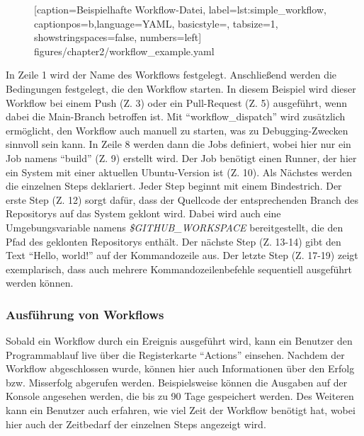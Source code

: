 \begin{figure}[h!]
	
			[caption={Beispielhafte Workflow-Datei},
			label={lst:simple_workflow},
			captionpos=b,language=YAML, basicstyle=\footnotesize, tabsize=1, showstringspaces=false,  numbers=left]
			{figures/chapter2/workflow_example.yaml}
			\end{figure}
In Zeile 1 wird der Name des Workflows festgelegt. Anschließend werden die Bedingungen festgelegt, die den Workflow starten. In diesem Beispiel wird dieser Workflow bei einem Push (Z. 3) oder ein Pull-Request (Z. 5) ausgeführt, wenn dabei die Main-Branch betroffen ist. Mit \enquote{workflow\_dispatch} wird zusätzlich ermöglicht, den Workflow auch manuell zu starten, was zu Debugging-Zwecken sinnvoll sein kann. In Zeile 8 werden dann die Jobs definiert, wobei hier nur ein Job namens \enquote{build} (Z. 9) erstellt wird. Der Job benötigt einen Runner, der hier ein System mit einer aktuellen Ubuntu-Version ist (Z. 10). Als Nächstes werden die einzelnen Steps deklariert. Jeder Step beginnt mit einem Bindestrich. Der erste Step (Z. 12) sorgt dafür, dass der Quellcode der entsprechenden Branch des Repositorys auf das System geklont wird. Dabei wird auch eine Umgebungsvariable namens \textit{\$GITHUB\_WORKSPACE} bereitgestellt, die den Pfad des geklonten Repositorys enthält. Der nächste Step (Z. 13-14) gibt den Text \enquote{Hello, world!} auf der Kommandozeile aus. Der letzte Step (Z. 17-19) zeigt exemplarisch, dass auch mehrere Kommandozeilenbefehle sequentiell ausgeführt  werden können.

\subsubsection{Ausführung von Workflows}
Sobald ein Workflow durch ein Ereignis ausgeführt wird, kann ein Benutzer den Programmablauf live über die Registerkarte \enquote{Actions} einsehen. Nachdem der Workflow abgeschlossen wurde, können hier auch Informationen über den Erfolg bzw. Misserfolg abgerufen werden. Beispielsweise können die Ausgaben auf der Konsole angesehen werden, die bis zu 90 Tage gespeichert werden.  Des Weiteren kann ein Benutzer auch erfahren, wie viel Zeit der Workflow benötigt hat, wobei hier auch der Zeitbedarf der einzelnen Steps angezeigt wird. 

